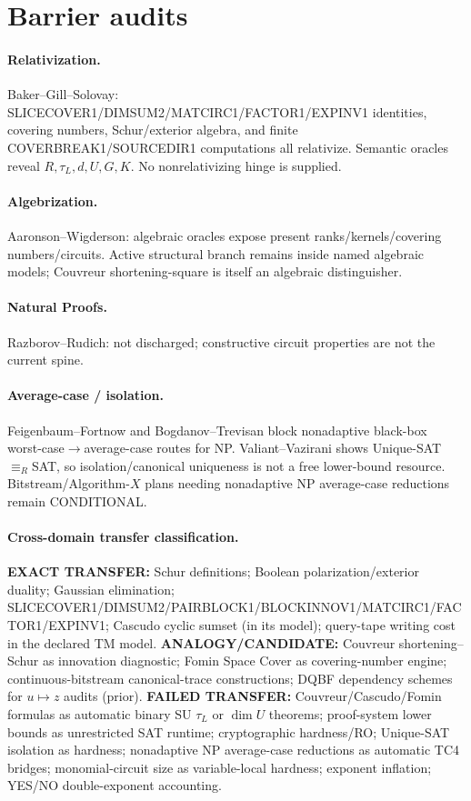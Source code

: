 \documentclass[11pt]{article}
\begin{document}
\section*{Barrier audits}
\paragraph{Relativization.}
Baker--Gill--Solovay: SLICECOVER1/DIMSUM2/MATCIRC1/FACTOR1/EXPINV1 identities, covering numbers,
Schur/exterior algebra, and finite COVERBREAK1/SOURCEDIR1 computations all relativize. Semantic
oracles reveal $R,\tau_L,d,U,G,K$. No nonrelativizing hinge is supplied.
\paragraph{Algebrization.}
Aaronson--Wigderson: algebraic oracles expose present ranks/kernels/covering numbers/circuits.
Active structural branch remains inside named algebraic models; Couvreur shortening-square is itself
an algebraic distinguisher.
\paragraph{Natural Proofs.}
Razborov--Rudich: not discharged; constructive circuit properties are not the current spine.
\paragraph{Average-case / isolation.}
Feigenbaum--Fortnow and Bogdanov--Trevisan block nonadaptive black-box worst-case$\to$average-case
routes for NP. Valiant--Vazirani shows Unique-SAT$\equiv_R$SAT, so isolation/canonical uniqueness
is not a free lower-bound resource. Bitstream/Algorithm-$X$ plans needing nonadaptive NP average-case
reductions remain CONDITIONAL.
\paragraph{Cross-domain transfer classification.}
\textbf{EXACT TRANSFER:} Schur definitions; Boolean polarization/exterior duality; Gaussian
elimination; SLICECOVER1/DIMSUM2/PAIRBLOCK1/BLOCKINNOV1/MATCIRC1/FACTOR1/EXPINV1; Cascudo cyclic
sumset (in its model); query-tape writing cost in the declared TM model.
\textbf{ANALOGY/CANDIDATE:} Couvreur shortening--Schur as innovation diagnostic; Fomin Space Cover
as covering-number engine; continuous-bitstream canonical-trace constructions; DQBF dependency
schemes for $u\mapsto z$ audits (prior).
\textbf{FAILED TRANSFER:} Couvreur/Cascudo/Fomin formulas as automatic binary SU $\tau_L$ or
$\dim U$ theorems; proof-system lower bounds as unrestricted SAT runtime; cryptographic hardness/RO;
Unique-SAT isolation as hardness; nonadaptive NP average-case reductions as automatic TC4 bridges;
monomial-circuit size as variable-local hardness; exponent inflation; YES/NO double-exponent
accounting.
\end{document}
